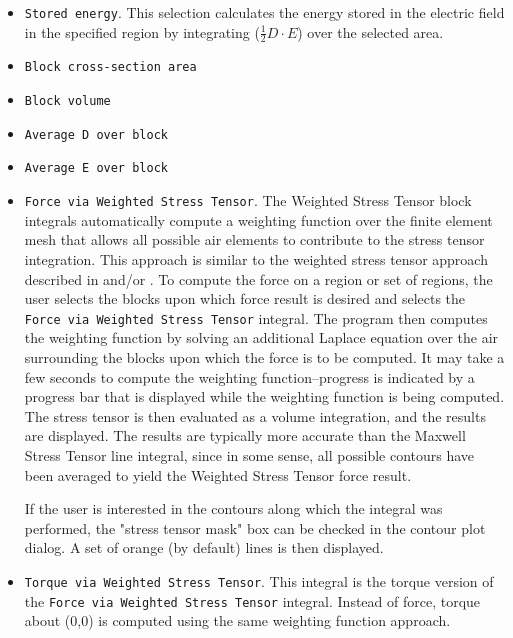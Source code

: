 \documentclass[12pt]{report}
\begin{document}
\begin{itemize}


\item \texttt{Stored energy}. This selection calculates the energy stored in the
electric field in the specified region by integrating ($\frac{1}{2}
D \cdot E$) over the selected area.

\item \texttt{Block cross-section area}

\item \texttt{Block volume}

\item \texttt{Average D over block}

\item \texttt{Average E over block}

\item \texttt{Force via Weighted Stress Tensor}. The Weighted Stress Tensor block
integrals automatically compute a weighting function over the
finite element mesh that allows all possible air elements to
contribute to the stress tensor integration. This approach is
similar to the weighted stress tensor approach described in
\cite{mcfee} and/or \cite{henforce}. To compute the force on a region or
set of regions, the user selects the blocks upon which force result
is desired and selects the \texttt{Force via Weighted Stress
Tensor} integral. The program then computes the weighting function
by solving an additional Laplace equation over the air surrounding
the blocks upon which the force is to be computed. It may take a
few seconds to compute the weighting function--progress is
indicated by a progress bar that is displayed while the weighting
function is being computed. The stress tensor is then evaluated as
a volume integration, and the results are displayed. The results
are typically more accurate than the Maxwell Stress Tensor line
integral, since in some sense, all possible contours have been
averaged to yield the Weighted Stress Tensor force result.


If the user is interested in the contours along which the integral was
performed, the "stress tensor mask" box can be checked in the contour plot
dialog. A set of orange (by default) lines is then displayed.

\item \texttt{Torque via Weighted Stress Tensor}. This integral is the torque version
of the \texttt{Force via Weighted Stress Tensor} integral. Instead
of force, torque about (0,0) is computed using the same weighting
function approach.
\end{itemize}
\end{document}
